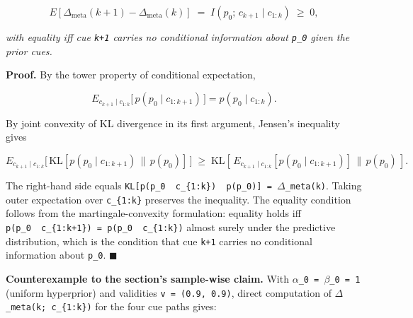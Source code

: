 \documentclass{article}
\begin{document}
\[
E[\Delta_{\mathrm{meta}}(k+1) - \Delta_{\mathrm{meta}}(k)] \;=\; I(p_0;\, c_{k+1} \mid c_{1:k}) \;\geq\; 0,
\]

\emph{with equality iff cue \texttt{k+1} carries no conditional
information about \texttt{p\_0} given the prior cues.}

\textbf{Proof.} By the tower property of conditional expectation,

\[
E_{c_{k+1} \mid c_{1:k}}\big[\, p(p_0 \mid c_{1:k+1}) \,\big] = p(p_0 \mid c_{1:k}).
\]

By joint convexity of KL divergence in its first argument, Jensen's
inequality gives

\[
E_{c_{k+1} \mid c_{1:k}}\big[\, \mathrm{KL}[p(p_0 \mid c_{1:k+1}) \,\|\, p(p_0)] \,\big] \;\geq\; \mathrm{KL}\!\left[\, E_{c_{k+1} \mid c_{1:k}}[p(p_0 \mid c_{1:k+1})] \,\Big\|\, p(p_0) \,\right].
\]

The right-hand side equals
\texttt{KL{[}p(p\_0\ \textbar{}\ c\_\{1:k\})\ \textbar{}\textbar{}\ p(p\_0){]}\ =\ \ensuremath{\Delta}\_meta(k)}.
Taking outer expectation over \texttt{c\_\{1:k\}} preserves the
inequality. The equality condition follows from the martingale-convexity
formulation: equality holds iff
\texttt{p(p\_0\ \textbar{}\ c\_\{1:k+1\})\ =\ p(p\_0\ \textbar{}\ c\_\{1:k\})}
almost surely under the predictive distribution, which is the condition
that cue \texttt{k+1} carries no conditional information about
\texttt{p\_0}. \ensuremath{\blacksquare}

\textbf{Counterexample to the section's sample-wise claim.} With
\texttt{\ensuremath{\alpha}\_0\ =\ \ensuremath{\beta}\_0\ =\ 1} (uniform hyperprior) and validities
\texttt{v\ =\ (0.9,\ 0.9)}, direct computation of
\texttt{\ensuremath{\Delta}\_meta(k;\ c\_\{1:k\})} for the four cue paths gives:
\end{document}
